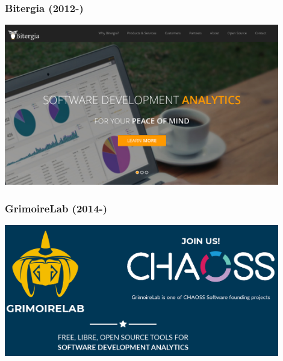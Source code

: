 \begin{frame}[fragile]
  \frametitle{Bitergia (2012-)}

  \begin{center}
  \includegraphics[width=12cm]{figs/bitergia}
  \end{center}  
  
\end{frame}

\begin{frame}[fragile]
  \frametitle{GrimoireLab (2014-)}

  \begin{center}
  \includegraphics[width=12cm]{figs/grimoirelab}
  \end{center}  
  
\end{frame}
